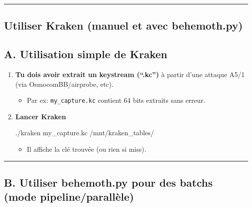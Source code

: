 \documentclass[
  french,
]{article}
\newenvironment{Shaded}{\begin{snugshade}}{\end{snugshade}}
\newcommand{\ExtensionTok}[1]{#1}
\newcommand{\NormalTok}[1]{#1}
\providecommand{\tightlist}{%
  \setlength{\itemsep}{0pt}\setlength{\parskip}{0pt}}
\begin{document}
\begin{center}\rule{0.5\linewidth}{0.5pt}\end{center}

\subsection{Utiliser Kraken (manuel et avec
behemoth.py)}\label{utiliser-kraken-manuel-et-avec-behemoth.py}

\subsection{A. Utilisation simple de
Kraken}\label{a.-utilisation-simple-de-kraken}

\begin{enumerate}
\def\labelenumi{\arabic{enumi}.}
\item
  \textbf{Tu dois avoir extrait un keystream (``.kc'')} à partir d'une
  attaque A5/1 (via OsmocomBB/airprobe, etc).

  \begin{itemize}
  \tightlist
  \item
    Par ex: \texttt{my\_capture.kc} contient 64 bits extraits sans
    erreur.
  \end{itemize}
\item
  \textbf{Lancer Kraken}

\begin{Shaded}
\begin{Highlighting}[]
\ExtensionTok{./kraken}\NormalTok{ my\_capture.kc /mnt/kraken\_tables/}
\end{Highlighting}
\end{Shaded}

  \begin{itemize}
  \tightlist
  \item
    Il affiche la clé trouvée (ou rien si miss).
  \end{itemize}
\end{enumerate}

\begin{center}\rule{0.5\linewidth}{0.5pt}\end{center}

\subsection{B. Utiliser behemoth.py pour des batchs (mode
pipeline/parallèle)}\label{b.-utiliser-behemoth.py-pour-des-batchs-mode-pipelineparalluxe8le}
\end{document}
